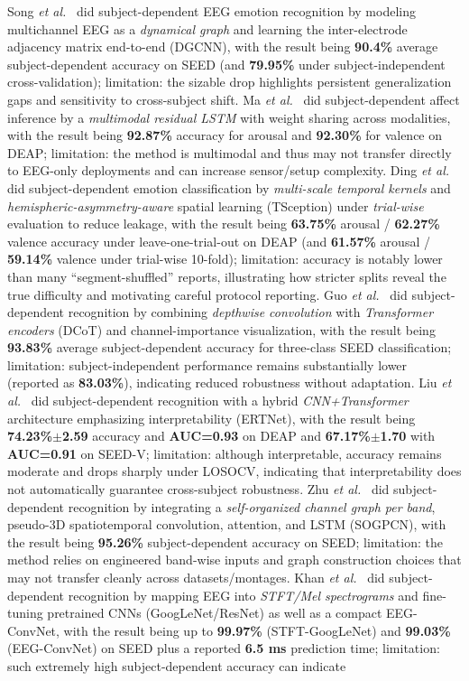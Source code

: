 \documentclass{WileyMSP-template}
\begin{document}
Song \textit{et al.}~\cite{song2020dgcnn} did subject-dependent EEG emotion recognition by modeling multichannel EEG as a \emph{dynamical graph} and learning the inter-electrode adjacency matrix end-to-end (DGCNN), with the result being \textbf{90.4\%} average subject-dependent accuracy on SEED (and \textbf{79.95\%} under subject-independent cross-validation); limitation: the sizable drop highlights persistent generalization gaps and sensitivity to cross-subject shift. Ma \textit{et al.}~\cite{ma2019mmreslstm} did subject-dependent affect inference by a \emph{multimodal residual LSTM} with weight sharing across modalities, with the result being \textbf{92.87\%} accuracy for arousal and \textbf{92.30\%} for valence on DEAP; limitation: the method is multimodal and thus may not transfer directly to EEG-only deployments and can increase sensor/setup complexity. Ding \textit{et al.}~\cite{ding2022tsception} did subject-dependent emotion classification by \emph{multi-scale temporal kernels} and \emph{hemispheric-asymmetry-aware} spatial learning (TSception) under \emph{trial-wise} evaluation to reduce leakage, with the result being \textbf{63.75\%} arousal / \textbf{62.27\%} valence accuracy under leave-one-trial-out on DEAP (and \textbf{61.57\%} arousal / \textbf{59.14\%} valence under trial-wise 10-fold); limitation: accuracy is notably lower than many ``segment-shuffled'' reports, illustrating how stricter splits reveal the true difficulty and motivating careful protocol reporting. Guo \textit{et al.}~\cite{guo2022dcot} did subject-dependent recognition by combining \emph{depthwise convolution} with \emph{Transformer encoders} (DCoT) and channel-importance visualization, with the result being \textbf{93.83\%} average subject-dependent accuracy for three-class SEED classification; limitation: subject-independent performance remains substantially lower (reported as \textbf{83.03\%}), indicating reduced robustness without adaptation. Liu \textit{et al.}~\cite{liu2024ertnet} did subject-dependent recognition with a hybrid \emph{CNN+Transformer} architecture emphasizing interpretability (ERTNet), with the result being \textbf{74.23\%$\pm$2.59} accuracy and \textbf{AUC=0.93} on DEAP and \textbf{67.17\%$\pm$1.70} with \textbf{AUC=0.91} on SEED-V; limitation: although interpretable, accuracy remains moderate and drops sharply under LOSOCV, indicating that interpretability does not automatically guarantee cross-subject robustness. Zhu \textit{et al.}~\cite{zhu2024sogpcn} did subject-dependent recognition by integrating a \emph{self-organized channel graph per band}, pseudo-3D spatiotemporal convolution, attention, and LSTM (SOGPCN), with the result being \textbf{95.26\%} subject-dependent accuracy on SEED; limitation: the method relies on engineered band-wise inputs and graph construction choices that may not transfer cleanly across datasets/montages. Khan \textit{et al.}~\cite{khan2024eegconvnet} did subject-dependent recognition by mapping EEG into \emph{STFT/Mel spectrograms} and fine-tuning pretrained CNNs (GoogLeNet/ResNet) as well as a compact EEG-ConvNet, with the result being up to \textbf{99.97\%} (STFT-GoogLeNet) and \textbf{99.03\%} (EEG-ConvNet) on SEED plus a reported \textbf{6.5 ms} prediction time; limitation: such extremely high subject-dependent accuracy can indicate 
\end{document}
